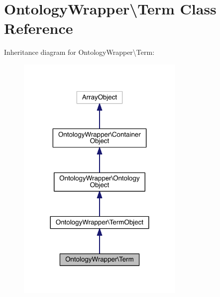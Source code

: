 \hypertarget{class_ontology_wrapper_1_1_term}{\section{Ontology\-Wrapper\textbackslash{}Term Class Reference}
\label{class_ontology_wrapper_1_1_term}
}


Inheritance diagram for Ontology\-Wrapper\textbackslash{}Term\-:\nopagebreak
\begin{figure}[H]
\begin{center}
\leavevmode
\includegraphics[width=228pt]{class_ontology_wrapper_1_1_term__inherit__graph}
\end{center}
\end{figure}


